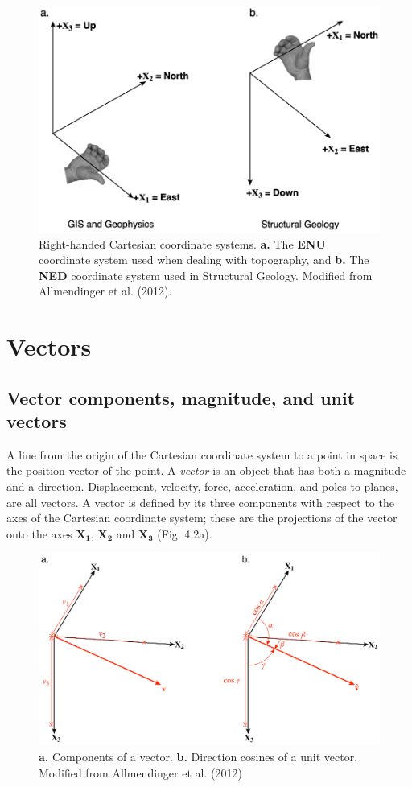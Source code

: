 \documentclass[a4paper , 12pt]{book}
\begin{document}
\begin{figure}[ht]
    \centering
    \includegraphics[width=13cm]{ch4f1.pdf}
    \caption{Right-handed Cartesian coordinate systems. \textbf{a.} The \textbf{ENU} coordinate system used when dealing with topography, and \textbf{b.} The \textbf{NED} coordinate system used in Structural Geology. Modified from Allmendinger et al. (2012).}
\end{figure}

\section{Vectors}

\subsection{Vector components, magnitude, and unit vectors}
A line from the origin of the Cartesian coordinate system to a point in space is the position vector of the point. A \textit{vector} is an object that has both a magnitude and a direction. Displacement, velocity, force, acceleration, and poles to planes, are all vectors. A vector is defined by its three components with respect to the axes of the Cartesian coordinate system; these are the projections of the vector onto the axes $\mathbf{X_1}$, $\mathbf{X_2}$ and $\mathbf{X_3}$ (Fig. 4.2a).

\begin{figure}[ht]
    \centering
    \includegraphics[width=13cm]{ch4f2.pdf}
    \caption{\textbf{a.} Components of a vector. \textbf{b.} Direction cosines of a unit vector. Modified from Allmendinger et al. (2012)}
\end{figure}
\end{document}
